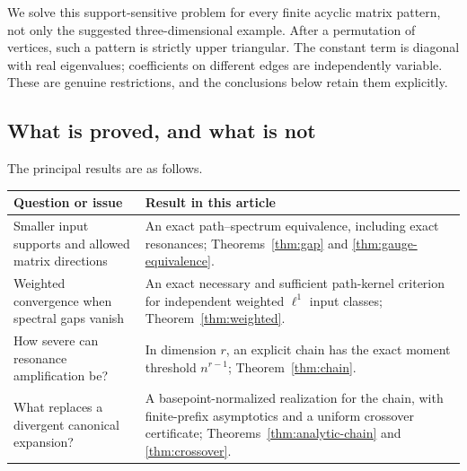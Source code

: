 \documentclass[11pt,a4paper]{article}
\numberwithin{equation}{section}
\theoremstyle{definition}
\theoremstyle{remark}
\begin{document}
We solve this support-sensitive problem for every finite acyclic matrix
pattern, not only the suggested three-dimensional example. After a
permutation of vertices, such a pattern is strictly upper triangular.
The constant term is diagonal with real eigenvalues; coefficients on
different edges are independently variable. These are genuine restrictions,
and the conclusions below retain them explicitly.

\subsection{What is proved, and what is not}
The principal results are as follows.
\begin{center}
\begin{tabularx}{\textwidth}{@{}>{\raggedright\arraybackslash}p{}X@{}}
\toprule
Question or issue & Result in this article\\
\midrule
Smaller input supports and allowed matrix directions &
An exact path--spectrum equivalence, including exact resonances;
Theorems~\ref{thm:gap} and \ref{thm:gauge-equivalence}.\\[3pt]
Weighted convergence when spectral gaps vanish &
An exact necessary and sufficient path-kernel criterion for independent
weighted $\ell^1$ input classes; Theorem~\ref{thm:weighted}.\\[3pt]
How severe can resonance amplification be? &
In dimension $r$, an explicit chain has the exact moment threshold
$n^{r-1}$; Theorem~\ref{thm:chain}.\\[3pt]
What replaces a divergent canonical expansion? &
A basepoint-normalized realization for the chain, with finite-prefix
asymptotics and a uniform crossover certificate;
Theorems~\ref{thm:analytic-chain} and \ref{thm:crossover}.\\
\bottomrule
\end{tabularx}
\end{center}
\end{document}
